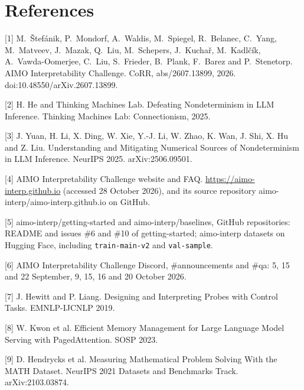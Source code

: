 \documentclass{article}
\begin{document}
\section*{References}
{\small
[1] M.~Štefánik, P.~Mondorf, A.~Waldis, M.~Spiegel, R.~Belanec, C.~Yang, M.~Matveev, J.~Mazak, Q.~Liu, M.~Schepers, J.~Kuchař, M.~Kadlčík, A.~Vawda-Oomerjee, C.~Liu, S.~Frieder, B.~Plank, F.~Barez and P.~Stenetorp. AIMO Interpretability Challenge. CoRR, abs/2607.13899, 2026. doi:10.48550/arXiv.2607.13899.

[2] H. He and Thinking Machines Lab. Defeating Nondeterminism in LLM Inference. Thinking Machines Lab: Connectionism, 2025.

[3] J. Yuan, H. Li, X. Ding, W. Xie, Y.-J. Li, W. Zhao, K. Wan, J. Shi, X. Hu and Z. Liu. Understanding and Mitigating Numerical Sources of Nondeterminism in LLM Inference. NeurIPS 2025. arXiv:2506.09501.

[4] AIMO Interpretability Challenge website and FAQ. \url{https://aimo-interp.github.io} (accessed 28 October 2026), and its source repository aimo-interp/aimo-interp.github.io on GitHub.

[5] aimo-interp/getting-started and aimo-interp/baselines, GitHub repositories: README and issues \#6 and \#10 of getting-started; aimo-interp datasets on Hugging Face, including \texttt{train-main-v2} and \texttt{val-sample}.

[6] AIMO Interpretability Challenge Discord, \#announcements and \#qa: 5, 15 and 22 September, 9, 15, 16 and 20 October 2026.

[7] J. Hewitt and P. Liang. Designing and Interpreting Probes with Control Tasks. EMNLP-IJCNLP 2019.

[8] W. Kwon et al. Efficient Memory Management for Large Language Model Serving with PagedAttention. SOSP 2023.

[9] D. Hendrycks et al. Measuring Mathematical Problem Solving With the MATH Dataset. NeurIPS 2021 Datasets and Benchmarks Track. arXiv:2103.03874.
}

\clearpage
\appendix
\raggedright







\newpage

\end{document}

